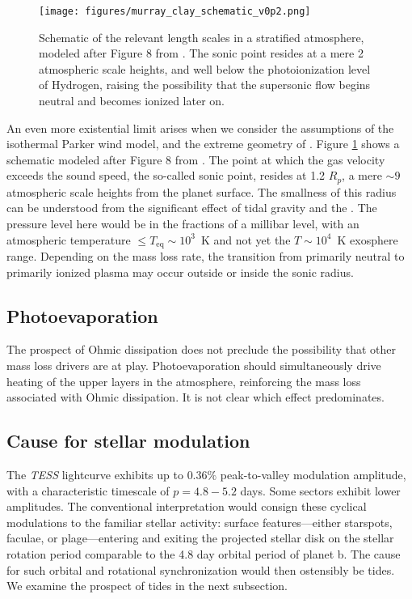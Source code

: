 \documentclass[twocolumn]{aastex631}
\newcommand{\hatpb}{\object{HAT-P-67 b}}
\begin{document}
\begin{figure}[t]
    \texttt{[image: figures/murray\_clay\_schematic\_v0p2.png]}
    \caption{Schematic of the relevant length scales in a stratified atmosphere, modeled after Figure 8 from \citet{2009ApJ...693...23M}.  The sonic point resides at a mere 2 atmospheric scale heights, and well below the photoionization level of Hydrogen, raising the possibility that the supersonic flow begins neutral and becomes ionized later on.}
    \label{fig:murrayClaySchematic}
\end{figure}


An even more existential limit arises when we consider the assumptions of the isothermal Parker wind model, and the extreme geometry of \hatpb.  Figure \ref{fig:murrayClaySchematic} shows a schematic modeled after Figure 8 from \citet{2009ApJ...693...23M}.  The point at which the gas velocity exceeds the sound speed, the so-called sonic point, resides at 1.2 $R_p$, a mere $\sim9$ atmospheric scale heights from the planet surface.  The smallness of this radius can be understood from the significant effect of tidal gravity and the .  The pressure level here would be in the fractions of a millibar level, with an atmospheric temperature $\le T_\mathrm{eq}\sim10^3$~K and not yet the $T\sim10^4$~K exosphere range.  Depending on the mass loss rate, the transition from primarily neutral to primarily ionized plasma may occur outside or inside the sonic radius.


\subsection{Photoevaporation}
The prospect of Ohmic dissipation does not preclude the possibility that other mass loss drivers are at play.  Photoevaporation should simultaneously drive heating of the upper layers in the atmosphere, reinforcing the mass loss associated with Ohmic dissipation.  It is not clear which effect predominates.

\subsection{Cause for stellar modulation}
The \emph{TESS} lightcurve exhibits up to $0.36\%$ peak-to-valley modulation amplitude, with a characteristic timescale of $p=4.8-5.2$ days. Some sectors exhibit lower amplitudes.  The conventional interpretation would consign these cyclical modulations to the familiar stellar activity: surface features---either starspots, faculae, or plage---entering and exiting the projected stellar disk on the stellar rotation period comparable to the 4.8 day orbital period of planet b.  The cause for such orbital and rotational synchronization would then ostensibly be tides.  We examine the prospect of tides in the next subsection.
\end{document}
